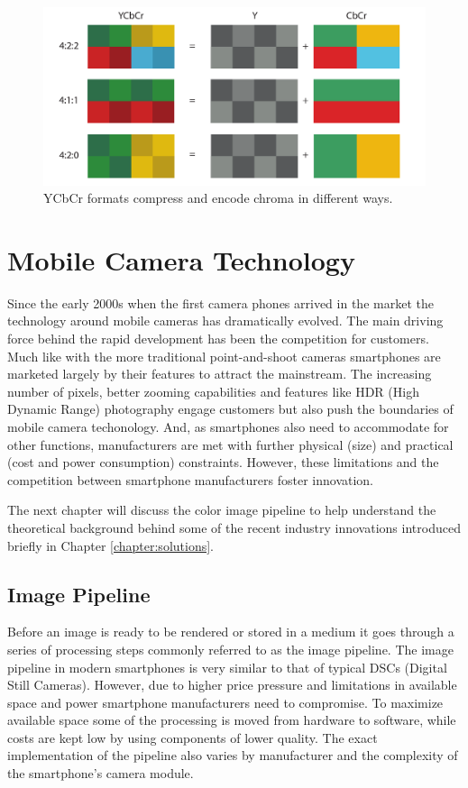 \documentclass[thesis.tex]{subfiles}
\begin{document}
\begin{figure}[ht]
\centering \includegraphics[width=\textwidth]{images/ycbcr}
\caption{YCbCr formats compress and encode chroma in different ways.\label{figure:ycbcr}}
\end{figure}


\section{Mobile Camera Technology}
Since the early 2000s when the first camera phones arrived in the market the technology around mobile cameras has dramatically evolved. The main driving force behind the rapid development has been the competition for customers. Much like with the more traditional point-and-shoot cameras smartphones are marketed largely by their features to attract the mainstream. The increasing number of pixels, better zooming capabilities and features like HDR (High Dynamic Range) photography engage customers but also push the boundaries of mobile camera techonology. And, as smartphones also need to accommodate for other functions, manufacturers are met with further physical (size) and practical (cost and power consumption) constraints. However, these limitations and the competition between smartphone manufacturers foster innovation.

The next chapter will discuss the color image pipeline to help understand the theoretical background behind some of the recent industry innovations introduced briefly in Chapter \ref{chapter:solutions}.

\subsection{Image Pipeline}
Before an image is ready to be rendered or stored in a medium it goes through a series of processing steps commonly referred to as the image pipeline. The image pipeline in modern smartphones is very similar to that of typical DSCs (Digital Still Cameras). However, due to higher price pressure and limitations in available space and power smartphone manufacturers need to compromise. To maximize available space some of the processing is moved from hardware to software, while costs are kept low by using components of lower quality. The exact implementation of the pipeline also varies by manufacturer and the complexity of the smartphone's camera module.
\end{document}
